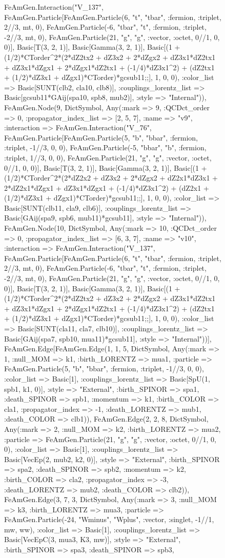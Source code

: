 \documentclass{revtex4}
\begin{document}
\begin{figure}[!htb]
\begin{center}
{FeAmGen.Interaction("V_137", FeAmGen.Particle[FeAmGen.Particle(6, "t", "tbar", :fermion, :triplet, 2//3, mt, 0), FeAmGen.Particle(-6, "tbar", "t", :fermion, :triplet, -2//3, mt, 0), FeAmGen.Particle(21, "g", "g", :vector, :octet, 0//1, 0, 0)], Basic[T(3, 2, 1)], Basic[Gamma(3, 2, 1)], Basic[(1 + (1/2)*CTorder^2*(2*dZ2tx2 + dZ3x2 + 2*dZgx2 + dZ3x1*dZ2tx1 + dZ3x1*dZgx1 + 2*dZgx1*dZ2tx1 + (-1/4)*dZ3x1^2) + (dZ2tx1 + (1/2)*dZ3x1 + dZgx1)*CTorder)*gcsub11;;], 1, 0, 0), :color_list => Basic[SUNT(clb2, cla10, clb8)], :couplings_lorentz_list => Basic[gcsub11*GAij(spa10, spb8, mub2)], :style => "Internal")), FeAmGen.Node(9, Dict{Symbol, Any}(:mark => 9, :QCDct_order => 0, :propagator_index_list => [2, 5, 7], :name => "v9", :interaction => FeAmGen.Interaction("V_76", FeAmGen.Particle[FeAmGen.Particle(5, "b", "bbar", :fermion, :triplet, -1//3, 0, 0), FeAmGen.Particle(-5, "bbar", "b", :fermion, :triplet, 1//3, 0, 0), FeAmGen.Particle(21, "g", "g", :vector, :octet, 0//1, 0, 0)], Basic[T(3, 2, 1)], Basic[Gamma(3, 2, 1)], Basic[(1 + (1/2)*CTorder^2*(2*dZ2x2 + dZ3x2 + 2*dZgx2 + dZ2x1*dZ3x1 + 2*dZ2x1*dZgx1 + dZ3x1*dZgx1 + (-1/4)*dZ3x1^2) + (dZ2x1 + (1/2)*dZ3x1 + dZgx1)*CTorder)*gcsub11;;], 1, 0, 0), :color_list => Basic[SUNT(clb11, cla9, clb6)], :couplings_lorentz_list => Basic[GAij(spa9, spb6, mub11)*gcsub11], :style => "Internal")), FeAmGen.Node(10, Dict{Symbol, Any}(:mark => 10, :QCDct_order => 0, :propagator_index_list => [6, 3, 7], :name => "v10", :interaction => FeAmGen.Interaction("V_137", FeAmGen.Particle[FeAmGen.Particle(6, "t", "tbar", :fermion, :triplet, 2//3, mt, 0), FeAmGen.Particle(-6, "tbar", "t", :fermion, :triplet, -2//3, mt, 0), FeAmGen.Particle(21, "g", "g", :vector, :octet, 0//1, 0, 0)], Basic[T(3, 2, 1)], Basic[Gamma(3, 2, 1)], Basic[(1 + (1/2)*CTorder^2*(2*dZ2tx2 + dZ3x2 + 2*dZgx2 + dZ3x1*dZ2tx1 + dZ3x1*dZgx1 + 2*dZgx1*dZ2tx1 + (-1/4)*dZ3x1^2) + (dZ2tx1 + (1/2)*dZ3x1 + dZgx1)*CTorder)*gcsub11;;], 1, 0, 0), :color_list => Basic[SUNT(cla11, cla7, clb10)], :couplings_lorentz_list => Basic[GAij(spa7, spb10, mua11)*gcsub11], :style => "Internal"))], FeAmGen.Edge[FeAmGen.Edge(1, 1, 5, Dict{Symbol, Any}(:mark => 1, :null_MOM => k1, :birth_LORENTZ => mua1, :particle => FeAmGen.Particle(5, "b", "bbar", :fermion, :triplet, -1//3, 0, 0), :color_list => Basic[1], :couplings_lorentz_list => Basic[SpU(1, spb1, k1, 0)], :style => "External", :birth_SPINOR => spa1, :death_SPINOR => spb1, :momentum => k1, :birth_COLOR => cla1, :propagator_index => -1, :death_LORENTZ => mub1, :death_COLOR => clb1)), FeAmGen.Edge(2, 2, 8, Dict{Symbol, Any}(:mark => 2, :null_MOM => k2, :birth_LORENTZ => mua2, :particle => FeAmGen.Particle(21, "g", "g", :vector, :octet, 0//1, 0, 0), :color_list => Basic[1], :couplings_lorentz_list => Basic[VecEp(2, mub2, k2, 0)], :style => "External", :birth_SPINOR => spa2, :death_SPINOR => spb2, :momentum => k2, :birth_COLOR => cla2, :propagator_index => -3, :death_LORENTZ => mub2, :death_COLOR => clb2)), FeAmGen.Edge(3, 7, 3, Dict{Symbol, Any}(:mark => 3, :null_MOM => k3, :birth_LORENTZ => mua3, :particle => FeAmGen.Particle(-24, "Wminus", "Wplus", :vector, :singlet, -1//1, mw, ww), :color_list => Basic[1], :couplings_lorentz_list => Basic[VecEpC(3, mua3, K3, mw)], :style => "External", :birth_SPINOR => spa3, :death_SPINOR => spb3, }
\end{center}
\end{figure}
\end{document}
